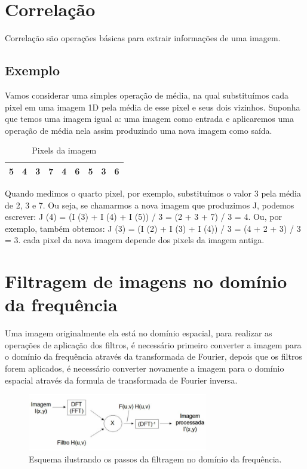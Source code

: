 \documentclass{article}
\begin{document}
    

\section{Correlação}
    Correlação são operações básicas para extrair informações de uma imagem.
    
    
\subsection{Exemplo}
    Vamos considerar uma simples operação de média, na qual substituímos cada pixel em uma imagem 1D pela média de esse pixel e seus dois vizinhos. Suponha que temos uma imagem igual a: uma imagem como entrada e aplicaremos uma operação de média nela assim produzindo uma nova imagem como saída.
    
    \begin{table}[h]
        \centering
        \caption{Pixels da imagem}
        \label{tabelacorrelação}
        \begin{tabular}{|l|l|l|l|l|l|l|l|l|}
        \hline
         5 & 4 & 3 & 7 & 4 & 6 & 5 & 3 & 6 \\ \hline
        \end{tabular}
        \end{table}
    Quando medimos o quarto pixel, por exemplo, substituímos o valor 3 pela média de 2, 3 e 7. Ou seja, se chamarmos a nova imagem que produzimos J, podemos escrever:
    J (4) = (I (3) + I (4) + I (5)) / 3 = (2 + 3 + 7) / 3 = 4. Ou, por exemplo, também obtemos:
    J (3) = (I (2) + I (3) + I (4)) / 3 = (4 + 2 + 3) / 3 = 3. cada pixel da nova imagem depende dos pixels da imagem antiga.

\section{Filtragem de imagens no domínio da frequência}
    Uma imagem originalmente ela está no domínio espacial, para realizar as operações de aplicação dos filtros, é necessário primeiro converter a imagem para o domínio da frequência através da transformada de Fourier, depois que os filtros forem aplicados, é necessário converter novamente a imagem para o domínio espacial através da formula de transformada de Fourier inversa.
    
     \begin{figure}[H]
        \centering
        \includegraphics[width=0.7\textwidth]{template/img/fig.png}
        \caption{Esquema ilustrando os passos da filtragem no domínio da frequência.}
        \label{fig:fig}
    \end{figure}
    
\end{document}
